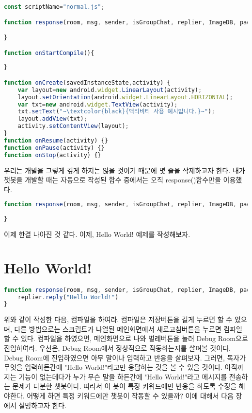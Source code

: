 \documentclass[10pt,b6paper,final]{book}
\begin{document}
\begin{lstlisting}[language=JavaScript,escapeinside=~~,caption={normal.js}]
const scriptName="normal.js";

function response(room, msg, sender, isGroupChat, replier, ImageDB, packageName, threadId){

}

function onStartCompile(){
    
}

function onCreate(savedInstanceState,activity) {
    var layout=new android.widget.LinearLayout(activity);
    layout.setOrientation(android.widget.LinearLayout.HORIZONTAL);
    var txt=new android.widget.TextView(activity);
    txt.setText("~\textcolor{black}{액티비티 사용 예시입니다.}~");
    layout.addView(txt);
    activity.setContentView(layout);
}
function onResume(activity) {}
function onPause(activity) {}
function onStop(activity) {}
\end{lstlisting}

우리는 개발을 그렇게 깊게 하지는 않을 것이기 때문에 몇 줄을 삭제하고자 한다.
내가 챗봇을 개발할 때는 자동으로 작성된 함수 중에서는 오직 response()함수만을 이용했다.

\begin{lstlisting}[language=JavaScript,escapeinside=~~]
function response(room, msg, sender, isGroupChat, replier, ImageDB, packageName, threadId){
    
}
\end{lstlisting}

이제 한결 나아진 것 같다. 이제, Hello World! 예제를 작성해보자.

\section{Hello World!}
\begin{lstlisting}[language=JavaScript,escapeinside=~~]
function response(room, msg, sender, isGroupChat, replier, ImageDB, packageName, threadId){
    replier.reply("Hello World!")
}
\end{lstlisting}
위와 같이 작성한 다음, 컴파일을 하여라.
컴파일은 저장버튼을 길게 누르면 할 수 있으며, 다른 방법으로는
스크립트가 나열된 메인화면에서 새로고침버튼을 누르면 컴파일할 수 있다.
컴파일을 하였으면, 메인화면으로 나와 벌레버튼을 눌러 Debug Room으로 진입하여라.
우선은, Debug Room에서 정상적으로 작동하는지를 살펴볼 것이다.
Debug Room에 진입하였으면 아무 말이나 입력하고 반응을 살펴보자.
그러면, 독자가 무엇을 입력하든간에 "Hello World!"라고만 응답하는 것을 볼 수 있을 것이다.
아직까지는 기능이 없는데다가 누가 무슨 말을 하든간에 "Hello World!"라고 메시지를 전송하는
문제가 다분한 챗봇이다. 따라서 이 봇이 특정 키워드에만 반응을 하도록 수정을 해야한다. 
어떻게 하면 특정 키워드에만 챗봇이 작동할 수 있을까?
이에 대해서 다음 장에서 설명하고자 한다.
\end{document}
